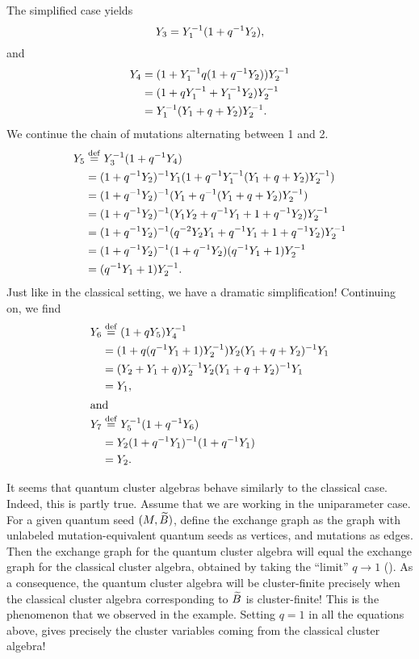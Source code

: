 The simplified case yields
\begin{equation*}
	Y_3 = Y_1^{-1} (1 + q^{-1} Y_2),
\end{equation*}
and
\begin{align*}
	Y_4
	 & = (1 + Y_1 ^{-1} q (1 + q^{-1} Y_2))Y_2^{-1} \\
	 & = (1 + q Y_1^{-1} + Y_1^{-1} Y_2)Y_2^{-1}    \\
	 & = Y_1^{-1} (Y_1 + q + Y_2)Y_2^{-1}.
\end{align*}
%
We continue the chain of mutations alternating between 1 and 2.
\begin{align*}
	Y_5
	 & \overset{\mathrm{def}}{=} Y_3^{-1} (1 + q^{-1} Y_4)                                             \\
	 & = (1 + q^{-1} Y_2)^{-1} Y_1 (1 + q^{-1} Y_1^{-1}( Y_1 + q + Y_2)Y_2^{-1})       \\
	 & = (1 + q^{-1} Y_2)^{-1}  (Y_1 + q^{-1} ( Y_1 + q + Y_2)Y_2^{-1})               \\
	 & = (1 + q^{-1} Y_2)^{-1}  (Y_1 Y_2 + q^{-1} Y_1 + 1 + q^{-1} Y_2)Y_2^{-1}        \\
	 & = (1 + q^{-1} Y_2)^{-1}  (q^{-2} Y_2 Y_1 + q^{-1} Y_1 + 1 + q^{-1} Y_2)Y_2^{-1} \\
	 & = (1 + q^{-1} Y_2)^{-1}  (1 + q^{-1} Y_2)(q^{-1} Y_1 + 1)Y_2^{-1}               \\
	 & = (q^{-1} Y_1 + 1)Y_2^{-1}.
\end{align*}
%
Just like in the classical setting, we have a dramatic simplification! Continuing on,
we find
\begin{align*}
	Y_6
	    & \overset{\mathrm{def}}{=} (1 + q Y_5)Y_4 ^{-1}                                 \\
	    & = (1 + q(q^{-1} Y_1 + 1)Y_2^{-1})Y_2 (Y_1 + q + Y_2)^{-1} Y_1 \\
	    & = (Y_2 +  Y_1 + q)Y_2^{-1} Y_2 (Y_1 + q + Y_2)^{-1} Y_1      \\
	    & = Y_1,                                                     \\
	\shortintertext{and}
	Y_7 & \overset{\mathrm{def}}{=} Y_5^{-1} (1 + q^{-1} Y_6)                             \\
	    & = Y_2 (1 + q^{-1} Y_1)^{-1} (1 + q^{-1} Y_1)                  \\
	    & = Y_2.
\end{align*}
%

It seems that quantum cluster algebras behave similarly to the classical case. Indeed,
this is partly true. Assume that we are working in the uniparameter case. For a given
quantum seed $(M, \widetilde{B})$, define the exchange graph as the graph with unlabeled
mutation-equivalent quantum seeds as vertices, and mutations as edges. Then the
exchange graph for the quantum cluster algebra will equal the exchange graph for the
classical cluster algebra, obtained by taking the ``limit'' $q \to 1$ (\cite[Theorem
	6.1]{BerensteinZelevinsky2005QCA}). As a consequence, the quantum cluster algebra will
be cluster-finite precisely when the classical cluster algebra corresponding to $\widetilde{B}$
is cluster-finite! This is the phenomenon that we observed in the example. Setting $q =
	1$ in all the equations above, gives precisely the cluster variables coming from the
classical cluster algebra!

